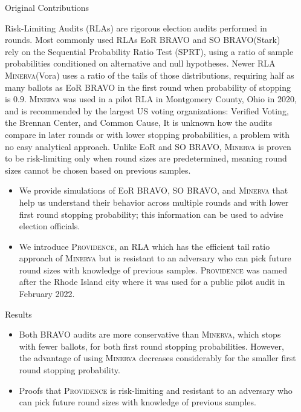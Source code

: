 \documentclass[final]{beamer}
\newcommand{\Minerva}{\textsc{Minerva}\xspace}
\newcommand{\Prov}{\textsc{Providence}\xspace}
\newcommand{\BRAVO}{\textsc{BRAVO}\xspace}
\newlength{\sepwidth}
\newlength{\colwidth}
\newcommand{\separatorcolumn}{\begin{column}{\sepwidth}\end{column}}
\begin{document}
\begin{frame}[t]
\begin{columns}[t]
\separatorcolumn

\begin{column}{\colwidth}

\begin{block}{Original Contributions}

Risk-Limiting Audits (RLAs) are rigorous election audits performed in rounds. 
Most commonly used RLAs EoR \BRAVO and SO \BRAVO (Stark) rely on the Sequential Probability Ratio Test (SPRT), using
a ratio of sample probabilities conditioned on alternative and null hypotheses.
Newer RLA \Minerva (Vora) uses a ratio of the tails of those distributions, requiring half as many
ballots as EoR \BRAVO in the first round when probability of stopping is $0.9$.
\Minerva was used in a pilot RLA in Montgomery County, Ohio in 2020,
and is recommended by the largest US voting organizations: Verified Voting, the Brennan Center, and Common Cause, 
It is unknown how the audits compare in later rounds or with lower stopping probabilities, a problem with no easy analytical approach.
Unlike EoR and SO \BRAVO, \Minerva is proven to be risk-limiting only when round sizes are predetermined, 
meaning round sizes cannot be chosen based on previous samples.
\begin{itemize}
\item
We provide simulations of EoR \BRAVO, SO \BRAVO, and \Minerva that help us understand their behavior across multiple rounds and with lower
first round stopping probability; this information can be used to advise election officials.
\item
We introduce \Prov, an RLA which has the efficient tail ratio approach of \Minerva but is resistant to an adversary who can pick
future round sizes with knowledge of previous samples. \Prov was named after the Rhode Island city where it was used for a public
pilot audit in February 2022.
\end{itemize}
\end{block}

\begin{block}{Results}

\begin{itemize}
\item Both \BRAVO audits are more conservative than \Minerva, which stops with fewer ballots, for both first round stopping probabilities. 
However, the advantage of using \Minerva decreases considerably for the smaller first round stopping probability.
\item Proofs that \Prov is risk-limiting and resistant to an adversary who can pick future round sizes with knowledge of previous samples.
\end{itemize}
\end{block}


\end{column}
\end{columns}
\end{frame}
\end{document}
